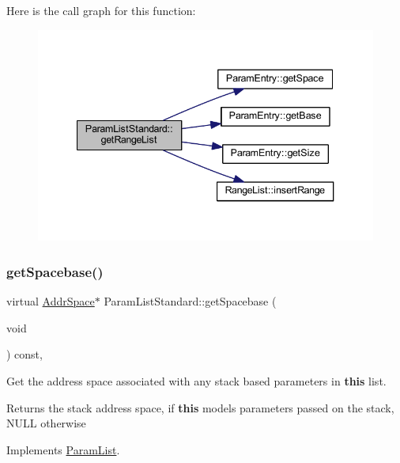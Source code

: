 Here is the call graph for this function\+:
\nopagebreak
\begin{figure}[H]
\begin{center}
\leavevmode
\includegraphics[width=340pt]{class_param_list_standard_a715b7fc4875a69e7e5b8b498002f03de_cgraph}
\end{center}
\end{figure}
\mbox{\label{class_param_list_standard_a8c6910cf8fb253c2f64361dbf92901c5}} 
\subsubsection{\texorpdfstring{getSpacebase()}{getSpacebase()}}
{\footnotesize\ttfamily virtual \mbox{\hyperlink{class_addr_space}{Addr\+Space}}$\ast$ Param\+List\+Standard\+::get\+Spacebase (\begin{DoxyParamCaption}\item[{void}]{ }\end{DoxyParamCaption}) const\hspace{0.3cm}{\ttfamily [inline]}, {\ttfamily [virtual]}}



Get the address space associated with any stack based parameters in {\bfseries{this}} list. 

\begin{DoxyReturn}{Returns}
the stack address space, if {\bfseries{this}} models parameters passed on the stack, N\+U\+LL otherwise 
\end{DoxyReturn}


Implements \mbox{\hyperlink{class_param_list_ae42fc70d73e1143e5dad67766e413f05}{Param\+List}}.



